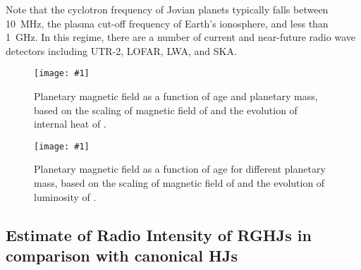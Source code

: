 \documentclass{emulateapj}
\def\memoDS#1{\color{blue}$[${\bf #1}$]$ \color{black}}
\def\plotoneh#1{\centering \leavevmode
\texttt{[image: \#1]}}
\begin{document}
Note that the cyclotron frequency of Jovian planets typically falls between 10~MHz, the plasma cut-off frequency of Earth's ionosphere, and less than 1~GHz. 
In this regime, there are a number of current and near-future radio wave detectors including UTR-2, LOFAR, LWA, and SKA. 



\begin{figure}[htbp]
   \plotoneh{fig1_linear.pdf}
   \caption{Planetary magnetic field as a function of age and planetary mass, based on the scaling of magnetic field of \citet{christensen2010} and the evolution of internal heat of \citet{burrows_et_al2001}.} %
  \label{fig:planetaryB_pre}
\end{figure}

\begin{figure}[htbp]
   \plotoneh{fig2_Christensen.pdf}
   \caption{Planetary magnetic field as a function of age for different planetary mass, based on the scaling of magnetic field of \citet{christensen2010} and the evolution of luminosity of \citet{burrows_et_al2001}.} %
  \label{fig:planetaryB}
\end{figure}


\subsection{Estimate of Radio Intensity of RGHJs in comparison with canonical HJs}
\label{ss:brightness}
\end{document}
